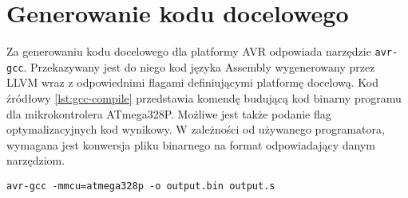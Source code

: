\section{Generowanie kodu docelowego}
Za generowaniu kodu docelowego dla platformy AVR odpowiada narzędzie \lstinline|avr-gcc|. Przekazywany jest do niego kod języka Assembly wygenerowany przez LLVM wraz z odpowiednimi flagami definiującymi platformę docelową. Kod źródłowy \ref{lst:gcc-compile} przedstawia komendę budującą kod binarny programu dla mikrokontrolera ATmega328P. Możliwe jest także podanie flag optymalizacyjnych kod wynikowy. W zależności od używanego programatora, wymagana jest konwersja pliku binarnego na format odpowiadający danym narzędziom.
\begin{lstlisting}[caption={Komenda kompilująca kod wynikowy z LLVM do kodu binarnego dla ATmega328P.}, label={lst:gcc-compile}]
avr-gcc -mmcu=atmega328p -o output.bin output.s
\end{lstlisting}




